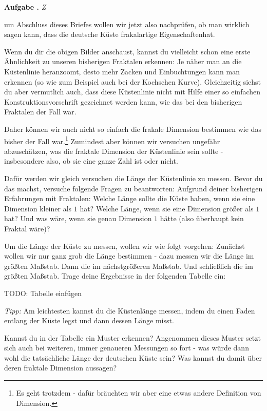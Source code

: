 \documentclass[a4paper,ngerman,12pt]{scrartcl}
\theoremstyle{definition}
\theoremstyle{plain}
\theoremstyle{remark}
\newlength{\aufgabenskip}
\newcounter{aufgabennummer}
\newenvironment{aufgabe}[1]{
  \addtocounter{aufgabennummer}{1}
  \textbf{Aufgabe \theaufgabennummer.} \emph{#1} \par
}{\vspace{\aufgabenskip}}
\begin{document}
\begin{aufgabe}
Zum Abschluss dieses Briefes wollen wir jetzt also nachprüfen, ob man wirklich sagen kann, dass die deutsche Küste \glqq frakalartige Eigenschaften\grqq hat. 

Wenn du dir die obigen Bilder anschaust, kannst du vielleicht schon eine erste Ähnlichkeit zu unseren bisherigen Fraktalen erkennen: Je näher man an die Küstenlinie heranzoomt, desto mehr Zacken und Einbuchtungen kann man erkennen (so wie zum Beispiel auch bei der Kochschen Kurve). Gleichzeitig siehst du aber vermutlich auch, dass diese Küstenlinie nicht mit Hilfe einer so einfachen Konstruktionsvorschrift gezeichnet werden kann, wie das bei den bisherigen Fraktalen der Fall war.

Daher können wir auch nicht so einfach die frakale Dimension bestimmen wie das bisher der Fall war.\footnote{Es geht trotzdem - dafür bräuchten wir aber eine etwas andere Definition von Dimension.} Zumindest aber können wir versuchen ungefähr abzuschätzen, was die fraktale Dimension der Küstenlinie sein sollte - insbesondere also, ob sie eine ganze Zahl ist oder nicht.

Dafür werden wir gleich versuchen die Länge der Küstenlinie zu messen. Bevor du das machst, versuche folgende Fragen zu beantworten: Aufgrund deiner bisherigen Erfahrungen mit Fraktalen: Welche Länge sollte die Küste haben, wenn sie eine Dimension kleiner als $1$ hat? Welche Länge, wenn sie eine Dimension größer als $1$ hat? Und was wäre, wenn sie genau Dimension $1$ hätte (also überhaupt kein Fraktal wäre)?

Um die Länge der Küste zu messen, wollen wir wie folgt vorgehen: Zunächst wollen wir nur ganz grob die Länge bestimmen - dazu messen wir die Länge im größten Maßstab. Dann die im nächstgrößeren Maßstab. Und schließlich die im größten Maßstab. Trage deine Ergebnisse in der folgenden Tabelle ein:

TODO: Tabelle einfügen 

\emph{Tipp:} Am leichtesten kannst du die Küstenlänge messen, indem du einen Faden entlang der Küste legst und dann dessen Länge misst.

Kannst du in der Tabelle ein Muster erkennen? Angenommen dieses Muster setzt sich auch bei weiteren, immer genaueren Messungen so fort - was würde dann wohl die tatsächliche Länge der deutschen Küste sein? Was kannst du damit über deren fraktale Dimension aussagen?
\end{aufgabe}
\end{document}
